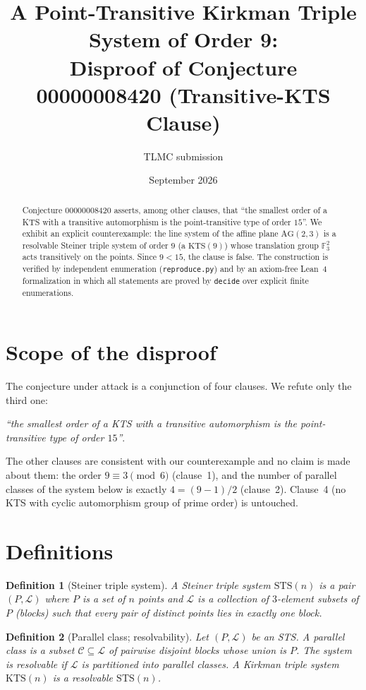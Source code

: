 \documentclass[11pt]{article}
\title{A Point-Transitive Kirkman Triple System of Order 9:\\
Disproof of Conjecture 00000008420 (Transitive-KTS Clause)}
\author{TLMC submission}
\date{September 2026}
\newtheorem{definition}{Definition}
\begin{document}
\maketitle

\begin{abstract}
Conjecture 00000008420 asserts, among other clauses, that ``the smallest order
of a KTS with a transitive automorphism is the point-transitive type of order
$15$''.  We exhibit an explicit counterexample: the line system of the affine
plane $\mathrm{AG}(2,3)$ is a resolvable Steiner triple system of order $9$
(a $\mathrm{KTS}(9)$) whose translation group $\mathbb{F}_3^2$ acts
transitively on the points.  Since $9 < 15$, the clause is false.
The construction is verified by independent enumeration
(\texttt{reproduce.py}) and by an axiom-free Lean~4 formalization in which all
statements are proved by \texttt{decide} over explicit finite enumerations.
\end{abstract}

\section{Scope of the disproof}

The conjecture under attack is a conjunction of four clauses.  We refute only
the third one:
\begin{center}
\emph{``the smallest order of a KTS with a transitive automorphism is the
point-transitive type of order $15$''}.
\end{center}
The other clauses are consistent with our counterexample and no claim is made
about them: the order $9 \equiv 3 \pmod 6$ (clause~1), and the number of
parallel classes of the system below is exactly $4 = (9-1)/2$ (clause~2).
Clause~4 (no KTS with cyclic automorphism group of prime order) is untouched.

\section{Definitions}

\begin{definition}[Steiner triple system]
A \emph{Steiner triple system} $\mathrm{STS}(n)$ is a pair $(P,\mathcal{L})$
where $P$ is a set of $n$ points and $\mathcal{L}$ is a collection of
$3$-element subsets of $P$ (blocks) such that every pair of distinct points
lies in exactly one block.
\end{definition}

\begin{definition}[Parallel class; resolvability]
Let $(P,\mathcal{L})$ be an STS.  A \emph{parallel class} is a subset
$\mathcal{C} \subseteq \mathcal{L}$ of pairwise disjoint blocks whose union is
$P$.  The system is \emph{resolvable} if $\mathcal{L}$ is partitioned into
parallel classes.  A \emph{Kirkman triple system} $\mathrm{KTS}(n)$ is a
resolvable $\mathrm{STS}(n)$.
\end{definition}
\end{document}

